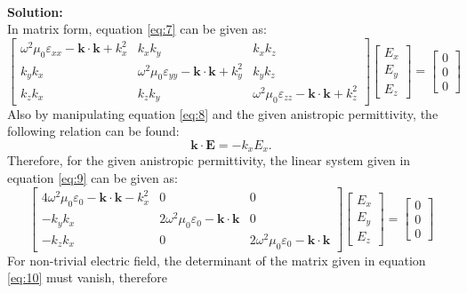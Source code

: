 \documentclass[11pt]{amsart}
\begin{document}
\begin{enumerate}
\begin{enumerate}
\begin{equation*}
\end{equation*}
\\
\textbf{Solution:}\\
In matrix form, equation \ref{eq:7} can be given as:
\begin{equation}
\label{eq:9}
\begin{bmatrix}
 \omega^2 \mu_0 \varepsilon_{xx}-\mathbf{k} \cdot \mathbf{k}+k_{x}^2 & k_{x}k_{y} & k_{x}k_{z} \\ 
k_{y}k_{x} & \omega^2 \mu_0 \varepsilon_{yy}-\mathbf{k} \cdot \mathbf{k}+k_{y}^2 & k_{y}k_{z} \\ 
k_{z}k_{x} & k_{z}k_{y} & \omega^2 \mu_0 \varepsilon_{zz}-\mathbf{k} \cdot \mathbf{k}+k_{z}^2
\end{bmatrix}
\begin{bmatrix}
E_x\\ 
E_y\\ 
E_z
\end{bmatrix}
=
\begin{bmatrix}
0\\ 
0\\ 
0
\end{bmatrix}
\end{equation}
Also by manipulating equation \ref{eq:8} and the given anistropic permittivity, the following relation can be found:
\begin{equation}
\mathbf{k}\cdot \mathbf{E}=-k_x E_x.
\end{equation}
Therefore, for the given anistropic permittivity, the linear system given in equation \ref{eq:9} can be given as:
\begin{equation}
\label{eq:10}
\begin{bmatrix}
 4 \omega^2 \mu_0 \varepsilon_{0}-\mathbf{k} \cdot \mathbf{k}-k_{x}^2 & 0 & 0\\ 
-k_{y}k_{x} & 2\omega^2 \mu_0 \varepsilon_{0}-\mathbf{k} \cdot \mathbf{k} & 0 \\ 
-k_{z}k_{x} & 0 & 2\omega^2 \mu_0 \varepsilon_{0}-\mathbf{k} \cdot \mathbf{k}
\end{bmatrix}
\begin{bmatrix}
E_x\\ 
E_y\\ 
E_z
\end{bmatrix}
=
\begin{bmatrix}
0\\ 
0\\ 
0
\end{bmatrix}
\end{equation}
For non-trivial electric field, the determinant of the matrix given in equation \ref{eq:10} must vanish, therefore

\end{enumerate}
\end{enumerate}
\end{document}
